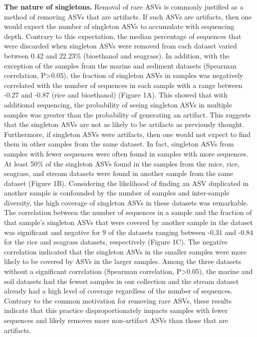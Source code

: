 \documentclass[]{article}
\begin{document}
\textbf{The nature of singletons.} Removal of rare ASVs is commonly
justified as a method of removing ASVs that are artifacts. If such ASVs
are artifacts, then one would expect the number of singleton ASVs to
accumulate with sequencing depth. Contrary to this expectation, the
median percentage of sequences that were discarded when singleton ASVs
were removed from each dataset varied between 0.42 and 22.23\%
(bioethanol and seagrass). In addition, with the exception of the
samples from the marine and sediment datasets (Spearman correlation,
P\textgreater{}0.05), the fraction of singleton ASVs in samples was
negatively correlated with the number of sequences in each sample with a
range between -0.27 and -0.87 (rice and bioethanol) (Figure 1A). This
showed that with additional sequencing, the probability of seeing
singleton ASVs in multiple samples was greater than the probability of
generating an artifact. This suggests that the singleton ASVs are not as
likely to be artifacts as previously thought. Furthermore, if singleton
ASVs were artifacts, then one would not expect to find them in other
samples from the same dataset. In fact, singleton ASVs from samples with
fewer sequences were often found in samples with more sequences. At
least 50\% of the singleton ASVs found in the samples from the mice,
rice, seagrass, and stream datasets were found in another sample from
the same dataset (Figure 1B). Considering the likelihood of finding an
ASV duplicated in another sample is confounded by the number of samples
and inter-sample diversity, the high coverage of singleton ASVs in these
datasets was remarkable. The correlation between the number of sequences
in a sample and the fraction of that sample's singleton ASVs that were
covered by another sample in the dataset was significant and negative
for 9 of the datasets ranging between -0.31 and -0.84 for the rice and
seagrass datasets, respectively (Figure 1C). The negative correlation
indicated that the singleton ASVs in the smaller samples were more
likely to be covered by ASVs in the larger samples. Among the three
datasets without a significant correlation (Spearman correlation,
P\textgreater{}0.05), the marine and soil datasets had the fewest
samples in our collection and the stream dataset already had a high
level of coverage regardless of the number of sequences. Contrary to the
common motivation for removing rare ASVs, these results indicate that
this practice disproportionately impacts samples with fewer sequences
and likely removes more non-artifact ASVs than those that are artifacts.
\end{document}
